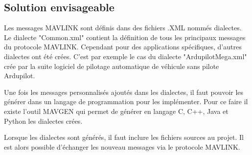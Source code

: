 \subsection{Solution envisageable }
Les messages MAVLINK sont définis dans des fichiers .XML nommés dialectes. Le dialecte "Common.xml" contient la définition de tous les principaux messages du protocole MAVLINK. Cependant pour des applications spécifiques, d'autres dialectes ont été crées. 
C'est par exemple le cas du dialecte "ArdupilotMega.xml" crée par la suite logiciel de pilotage automatique de véhicule sans pilote Ardupilot.\newline

Une fois les messages personnalisés ajoutés dans les dialectes, il faut pouvoir les générer dans un langage de programmation pour les implémenter. Pour ce faire il existe l'outil MAVGEN qui permet de générer en langage C, C++, Java et Python les dialectes crées.\newline

Lorsque les dialectes sont générés, il faut inclure les fichiers sources au projet. Il est alors possible d'échanger les nouveau messages via le protocole MAVLINK. 